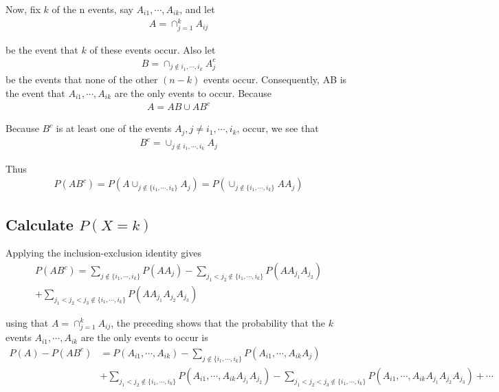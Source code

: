 \documentclass[10 pt,final]{article}
\newcommand{\impo}[1]{{\color{magenta} #1}}
\begin{document}
Now, fix $k$ of the n events, say $A_{i1}, \cdots, A_{ik}$, and let 
\begin{align*}
A = \cap^k_{j=1} A_{ij}
\end{align*}

be the event that $k$ of these events occur. Also let
\begin{align*}
B = \cap_{j \not\in {i_1, \cdots, i_k} }A^c_j 
\end{align*}
be the events that none of the other $(n-k)$ events occur. Consequently, AB is the event that $A_{i1}, \cdots, A_{ik}$ are the only events to occur. Because
\begin{align*}
A = AB \cup AB^c
\end{align*}

Because $B^c$ is at least one of the events $A_j, j \neq {i_1, \cdots, i_k}$, occur, we see that 
\begin{align*}
B^c = \cup_{j \not\in {i_1, \cdots, i_k}} A_j
\end{align*}

Thus
\begin{align*}
P(AB^c) = P(A \cup_{j \not\in \{i_1, \cdots, i_k\}} A_j) = P(\cup_{j \not\in \{i_1, \cdots, i_k\}} AA_j)
\end{align*}

\subsection{Calculate $P(X=k)$}
Applying the \impo{inclusion-exclusion} identity gives
\begin{align*}
P(AB^c) = \sum_{j \not\in \{i_1, \cdots, i_k\}} P(AA_j) - \sum_{j_1 < j_2 \not\in \{i_1, \cdots, i_k\}} P(AA_{j_1}A_{j_2}) \\
+ \sum_{j_1 < j_2 < j_3 \not\in \{i_1, \cdots, i_k\}} P(AA_{j_1}A_{j_2}A_{j_3})
\end{align*}

using that $A = \cap^k_{j=1} A_{ij}$, the preceding shows that the probability that the $k$ events $A_{i1}, \cdots, A_{ik}$ are the only events to occur is
\begin{align*}
P(A) - P(AB^c) & = P(A_{i1}, \cdots, A_{ik}) - \sum_{j \not\in \{i_1, \cdots, i_k\}} P(A_{i1}, \cdots, A_{ik}A_j)\\
& +  \sum_{j_1 < j_2 \not\in \{i_1, \cdots, i_k\}} P(A_{i1}, \cdots, A_{ik}A_{j_1}A_{j_2})  - \sum_{j_1 < j_2 < j_3 \not\in \{i_1, \cdots, i_k\}} P(A_{i1}, \cdots, A_{ik}A_{j_1}A_{j_2}A_{j_3}) + \cdots
\end{align*}
\end{document}
